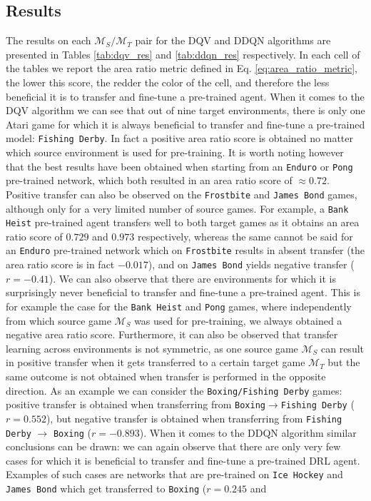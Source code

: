 \begin{figure}[ht!]
	
\label{fig:area_under_curve}
\end{figure}

\subsection{Results}
The results on each $\mathcal{M}_S/\mathcal{M}_T$ pair for the DQV and DDQN algorithms are presented in Tables \ref{tab:dqv_res} and \ref{tab:ddqn_res} respectively. In each cell of the tables we report the area ratio metric defined in Eq. \ref{eq:area_ratio_metric}, the lower this score, the redder the color of the cell, and therefore the less beneficial it is to transfer and fine-tune a pre-trained agent. When it comes to the DQV algorithm we can see that out of nine target environments, there is only one Atari game for which it is always beneficial to transfer and fine-tune a pre-trained model: \texttt{Fishing Derby}. In fact a positive area ratio score is obtained no matter which source environment is used for pre-training. It is worth noting however that the best results have been obtained when starting from an \texttt{Enduro} or \texttt{Pong} pre-trained network, which both resulted in an area ratio score of $\approx 0.72$. Positive transfer can also be observed on the \texttt{Frostbite} and \texttt{James Bond} games, although only for a very limited number of source games. For example, a \texttt{Bank Heist} pre-trained agent transfers well to both target games as it obtains an area ratio score of $0.729$ and $0.973$ respectively, whereas the same cannot be said for an \texttt{Enduro} pre-trained network which on \texttt{Frostbite} results in absent transfer (the area ratio score is in fact $-0.017$), and on \texttt{James Bond} yields negative transfer ($r=-0.41$). We can also observe that there are environments for which it is surprisingly never beneficial to transfer and fine-tune a pre-trained agent. This is for example the case for the \texttt{Bank Heist} and \texttt{Pong} games, where independently from which source game $\mathcal{M}_S$ was used for pre-training, we always obtained a negative area ratio score. Furthermore, it can also be observed that transfer learning across environments is not symmetric, as one source game $\mathcal{M}_S$ can result in positive transfer when it gets transferred to a certain target game $\mathcal{M}_T$ but the same outcome is not obtained when transfer is performed in the opposite direction. As an example we can consider the \texttt{Boxing/Fishing Derby} games: positive transfer is obtained when transferring from \texttt{Boxing}$\rightarrow$\texttt{Fishing Derby} ($r=0.552$), but negative transfer is obtained when transferring from \texttt{Fishing Derby} $\rightarrow$ \texttt{Boxing} ($r=-0.893$).  When it comes to the DDQN algorithm similar conclusions can be drawn: we can again observe that there are only very few cases for which it is beneficial to transfer and fine-tune a pre-trained DRL agent. Examples of such cases are networks that are pre-trained on \texttt{Ice Hockey} and \texttt{James Bond} which get transferred to \texttt{Boxing} ($r=0.245$ and 